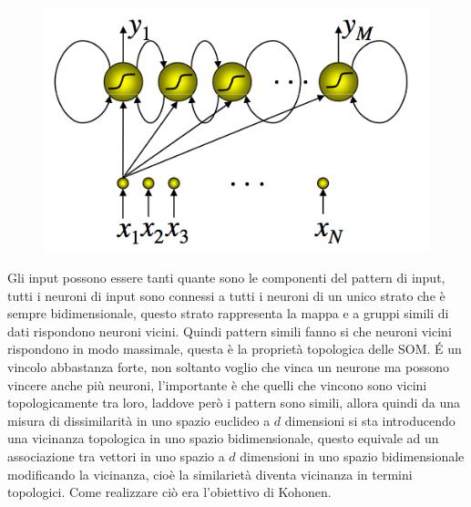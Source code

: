 \begin{figure}
\centering
\includegraphics[scale=0.5]{img/mappe1.png}
\caption{}
\label{mappe1}
\end{figure}
Gli input possono essere tanti quante sono le componenti del pattern di input, tutti i neuroni di input sono connessi a tutti i neuroni di un unico strato che è sempre bidimensionale, questo strato rappresenta la mappa e a gruppi simili di dati rispondono neuroni vicini. Quindi pattern simili fanno si che neuroni vicini rispondono in modo massimale, questa è la proprietà topologica delle SOM. \'E un vincolo abbastanza forte, non soltanto voglio che vinca un neurone ma possono vincere anche  più neuroni, l'importante è che quelli che vincono sono vicini topologicamente tra loro, laddove però i pattern sono simili, allora quindi da una misura di dissimilarità in uno spazio euclideo a $d$ dimensioni si sta introducendo una vicinanza topologica in uno spazio bidimensionale, questo equivale ad un associazione tra vettori in uno spazio a $d$ dimensioni in uno spazio bidimensionale modificando la vicinanza, cioè la similarietà diventa vicinanza in termini topologici. Come realizzare ciò era l'obiettivo di Kohonen.\\  

